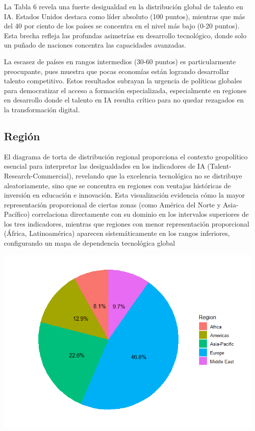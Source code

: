 \documentclass[
]{article}
\begin{document}
\begin{multicols}{2}

La Tabla 6 revela una fuerte desigualdad en la distribución global de talento en IA. Estados Unidos destaca como líder absoluto (100 puntos), mientras que más del 40 por ciento de los países se concentra en el nivel más bajo (0-20 puntos). Esta brecha refleja las profundas asimetrías en desarrollo tecnológico, donde solo un puñado de naciones concentra las capacidades avanzadas.

La escasez de países en rangos intermedios (30-60 puntos) es particularmente preocupante, pues muestra que pocas economías están logrando desarrollar talento competitivo. Estos resultados subrayan la urgencia de políticas globales para democratizar el acceso a formación especializada, especialmente en regiones en desarrollo donde el talento en IA resulta crítico para no quedar rezagados en la transformación digital.

\subsection{Región}


El diagrama de torta de distribución regional proporciona el contexto geopolítico esencial para interpretar las desigualdades en los indicadores de IA (Talent-Research-Commercial), revelando que la excelencia tecnológica no se distribuye aleatoriamente, sino que se concentra en regiones con ventajas históricas de inversión en educación e innovación. Esta visualización evidencia cómo la mayor representación proporcional de ciertas zonas (como América del Norte y Asia-Pacífico) correlaciona directamente con su dominio en los intervalos superiores de los tres indicadores, mientras que regiones con menor representación proporcional (África, Latinoamérica) aparecen sistemáticamente en los rangos inferiores, configurando un mapa de dependencia tecnológica global

\includegraphics[width=\linewidth]{Efrain(torta).png}



\end{multicols}
\end{document}
